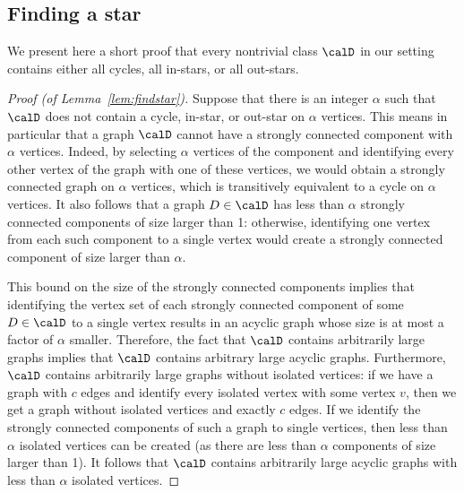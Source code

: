 \subsection{Finding a star}
We present here a short proof that every nontrivial class $\calD$ in our setting contains either all cycles, all in-stars, or all out-stars.
\label{sec:findstar}
\begin{proof}[Proof (of Lemma~\ref{lem:findstar})]
  Suppose that there is an integer $\alpha$ such that $\calD$ does not contain a cycle, in-star, or out-star on $\alpha$ vertices. This means in particular that a graph $\calD$ cannot have a strongly connected component with $\alpha$ vertices. Indeed, by selecting $\alpha$ vertices of the component and identifying every other vertex of the graph with one of these vertices, we would obtain a strongly connected graph on $\alpha$ vertices, which is transitively equivalent to a cycle on $\alpha$ vertices.
It also follows that a graph $D\in\calD$ has less than $\alpha$ strongly connected components of size larger than 1: otherwise, identifying one vertex from each such component to a single vertex would create a strongly connected component of size larger than $\alpha$.
  
This bound on the size of the strongly connected components implies that identifying the vertex set of each strongly connected component of some $D\in\calD$ to a single vertex results in an acyclic graph whose size is at most a factor of $\alpha$ smaller. Therefore, the fact that $\calD$ contains arbitrarily large graphs implies that $\calD$ contains arbitrary large acyclic graphs.
Furthermore, $\calD$ contains arbitrarily large graphs without isolated vertices: if we have a graph with $c$ edges and identify every isolated vertex with some vertex $v$, then we get a graph without isolated vertices and exactly $c$ edges. If we identify the strongly connected components of such a graph to single vertices, then less than $\alpha$ isolated vertices can be created (as there are less than $\alpha$ components of size larger than 1). It follows that $\calD$ contains arbitrarily large acyclic graphs with less than $\alpha$ isolated vertices. 


\end{proof}
